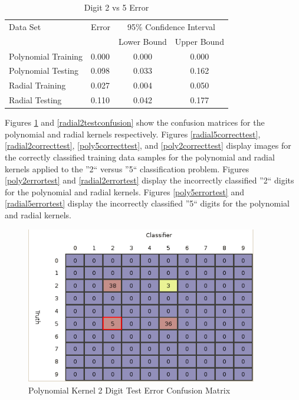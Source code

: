 \documentclass{article}
\begin{document}
\begin{table}
\caption{Digit 2 vs 5 Error}
\begin{center}
\begin{tabular}{llcc}
\toprule
Data Set & Error & \multicolumn{2}{c}{95\% Confidence Interval} \\
\cmidrule(r){3-4}
& & Lower Bound & Upper Bound \\
\midrule
Polynomial Training & 0.000 & 0.000 & 0.000 \\
Polynomial Testing & 0.098 & 0.033 & 0.162 \\
Radial Training & 0.027 & 0.004 & 0.050 \\
Radial Testing & 0.110 & 0.042 & 0.177 \\
\bottomrule
\end{tabular}
\label{error1}
\end{center}
\end{table}

Figures \ref{poly2testconfusion} and \ref{radial2testconfusion} show the confusion matrices for the polynomial and radial kernels respectively. Figures \ref{radial5correcttest}, \ref{radial2correcttest}, \ref{poly5correcttest}, and \ref{poly2correcttest} display images for the correctly classified training data samples for the polynomial and radial kernels applied to the ''2`` versus ''5`` classification problem. Figures \ref{poly2errortest} and \ref{radial2errortest} display the incorrectly classified ''2`` digits for the polynomial and radial kernels. Figures \ref{poly5errortest} and \ref{radial5errortest} display the incorrectly classified ''5`` digits for the polynomial and radial kernels.

\begin{figure}
\centering
\includegraphics[width=0.9\textwidth]{images/test2_5_confusion_a0156.png}
\caption{Polynomial Kernel 2 Digit Test Error Confusion Matrix}
\label{poly2testconfusion}
\end{figure}
\end{document}
